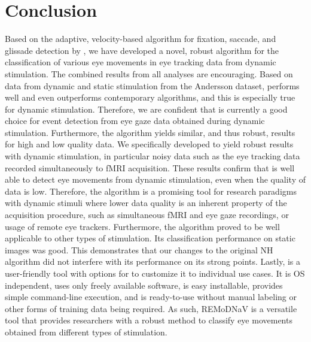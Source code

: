 \section*{Conclusion}\label{con}
Based on the adaptive, velocity-based algorithm for fixation, saccade, and
glissade detection by \cite{Nystrom2010AnData}, we have developed a novel,
robust algorithm for the classification of various eye movements in eye tracking
data from dynamic stimulation.
The combined results from all analyses are encouraging. Based on data from dynamic and static stimulation from the
Andersson dataset, \remodnav performs well and even outperforms contemporary algorithms, and this is especially true
for dynamic stimulation. Therefore, we are confident
that \remodnav is currently a good choice for event detection from eye gaze data obtained during dynamic stimulation.
Furthermore, the algorithm yields similar, and thus robust, results for high and low quality data. We specifically
developed \remodnav to yield robust results with dynamic stimulation, in particular noisy data such as the eye
tracking data recorded simultaneously to fMRI acquisition. These results confirm that \remodnav is well able to detect
eye movements from dynamic stimulation, even when the quality of data is low. Therefore, the algorithm is a promising
tool for research paradigms with dynamic stimuli where lower data quality is an inherent property of the acquisition
procedure, such as simultaneous fMRI and eye gaze recordings, or usage of remote eye trackers.
Furthermore, the algorithm proved to be well applicable to other types of stimulation. Its classification
performance on static images was good. This demonstrates that our changes to the original NH algorithm did not
interfere with its performance on its strong points. Lastly, \remodnav is a user-friendly tool with options for
to customize it to individual use cases. It is OS independent, uses only freely available software, is easy
installable, provides simple command-line execution, and is ready-to-use without manual labeling or other forms
of training data being required. As such, REMoDNaV is a versatile tool that provides researchers with a robust
method to classify eye movements obtained from different types of stimulation.

